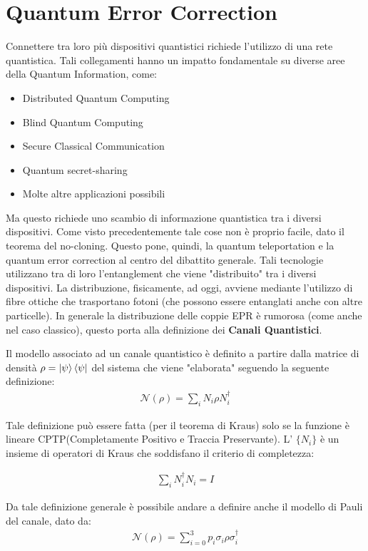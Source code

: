 \chapter{Quantum Error Correction}
Connettere tra loro più dispositivi quantistici richiede l'utilizzo di una rete quantistica. Tali collegamenti hanno un impatto fondamentale su diverse aree della Quantum Information, come:
\begin{itemize}
    \item Distributed Quantum Computing
    \item Blind Quantum Computing
    \item Secure Classical Communication
    \item Quantum secret-sharing
    \item Molte altre applicazioni possibili
\end{itemize}

Ma questo richiede uno scambio di informazione quantistica tra i diversi dispositivi. Come visto precedentemente tale cose non è proprio facile, dato il teorema del no-cloning. Questo pone, quindi, la quantum teleportation e la quantum error correction al centro del dibattito generale. Tali tecnologie utilizzano tra di loro l'entanglement che viene "distribuito" tra i diversi dispositivi. La distribuzione, fisicamente, ad oggi, avviene mediante l'utilizzo di fibre ottiche che trasportano fotoni (che possono essere entanglati anche con altre particelle). In generale la distribuzione delle coppie EPR è rumorosa (come anche nel caso classico), questo porta alla definizione dei \textbf{Canali Quantistici}.

Il modello associato ad un canale quantistico è definito a partire dalla matrice di densità \(\rho = \ket{\psi}\bra{\psi}\) del sistema che viene "elaborata" seguendo la seguente definizione:
\begin{gather*}
    \mathcal{N}(\rho) = \sum_i N_i \rho N_i^\dagger
\end{gather*}

Tale definizione può essere fatta (per il teorema di Kraus) solo se la funzione è lineare CPTP(Completamente Positivo e Traccia Preservante). L' \(\{N_i\}\) è un insieme di operatori di Kraus che soddisfano il criterio di completezza:

\begin{gather*}
    \sum_i N_i^\dagger N_i = I
\end{gather*}

Da tale definizione generale è possibile andare a definire anche il modello di Pauli del canale, dato da:
\begin{gather*}
    \mathcal{N}(\rho) = \sum_{i=0}^3p_i \sigma_i \rho \sigma_i^\dagger
\end{gather*}

